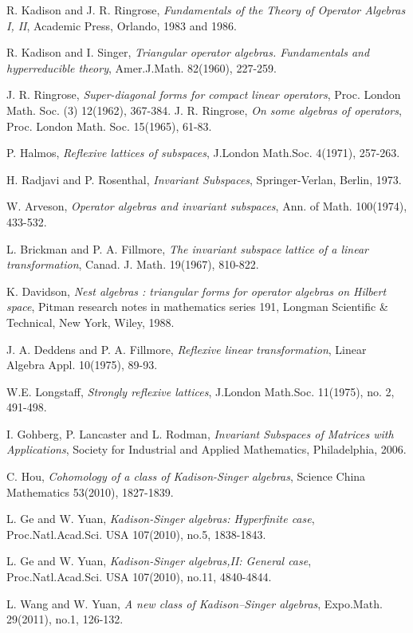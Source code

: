 \documentclass[a4paper,10pt]{amsart}
\theoremstyle{refs}
\begin{document}
\begin{thebibliography}{1}

 R. Kadison and J. R. Ringrose, 
    {\em{Fundamentals of the Theory of
Operator Algebras I, II}}, Academic Press, Orlando, 1983 and 1986.

 R. Kadison and I. Singer, {\em{Triangular operator algebras.
Fundamentals and hyperreducible
theory}}, Amer.J.Math. 82(1960), 227-259.

 J. R. Ringrose,
    {\em{Super-diagonal forms for compact linear operators}},
    Proc. London Math. Soc. (3) 12(1962), 367-384.
 J. R. Ringrose,
    {\em{On some algebras of operators}},
    Proc. London Math. Soc. 15(1965), 61-83.

 P. Halmos, {\em{Reflexive lattices of subspaces}}, J.London
Math.Soc. 4(1971), 257-263.

 H. Radjavi and P. Rosenthal, {\em{Invariant Subspaces}},
Springer-Verlan, Berlin, 1973.

 W. Arveson, {\em{Operator algebras and invariant subspaces}},
    Ann. of Math. 100(1974), 433-532.

 L. Brickman and P. A. Fillmore,
    {\em{The invariant subspace
lattice of a linear transformation}}, Canad. J. Math. 19(1967), 810-822.

 K. Davidson,
    {\em{Nest algebras : triangular forms for operator algebras on
    Hilbert space}}, Pitman research notes in mathematics series 191,
    Longman Scientific \& Technical, New York, Wiley, 1988.

 J. A. Deddens and P. A. Fillmore, {\em{Reflexive linear
transformation}}, Linear Algebra Appl. 10(1975), 89-93.

 W.E. Longstaff,
    {\em{Strongly reflexive lattices}},
    J.London Math.Soc. 11(1975), no. 2, 491-498.

 I. Gohberg, P. Lancaster and L. Rodman,
{\em{Invariant Subspaces of Matrices with Applications}}, Society for
Industrial and Applied Mathematics, Philadelphia, 2006.

 C. Hou, {\em{Cohomology of a class of Kadison-Singer
algebras}}, Science China Mathematics 53(2010), 1827-1839.

 L. Ge and W. Yuan,
    {\em{Kadison-Singer algebras: Hyperfinite case}},
    Proc.Natl.Acad.Sci. USA 107(2010), no.5, 1838-1843.

 L. Ge and W. Yuan, {\em{Kadison-Singer algebras,II:
    General case}}, Proc.Natl.Acad.Sci. USA 107(2010), no.11, 4840-4844.

 L. Wang and W. Yuan,
    {\em{A new class of Kadison–Singer algebras}},
    Expo.Math. 29(2011), no.1, 126-132.



\end{thebibliography}
\end{document}
